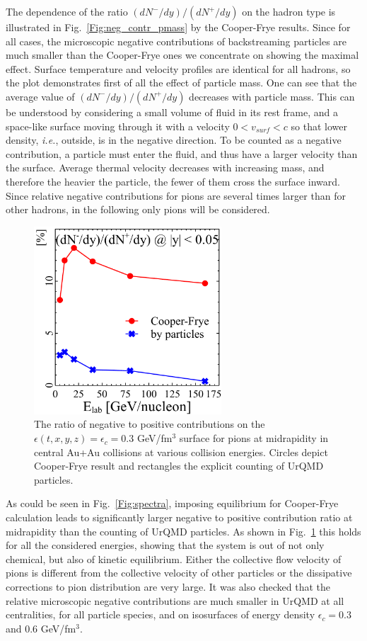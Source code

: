 The dependence of the ratio $(dN^-/dy)/(dN^+/dy)$ on the hadron type
is illustrated in Fig.~\ref{Fig:neg_contr_pmass} by the Cooper-Frye
results. Since for all cases, the microscopic negative contributions
of backstreaming particles are much smaller than the Cooper-Frye ones
we concentrate on showing the maximal effect. Surface temperature and
velocity profiles are identical for all hadrons, so the plot
demonstrates first of all the effect of particle mass. One can see
that the average value of $(dN^-/dy)/(dN^+/dy)$ decreases with
particle mass. This can be understood by considering a small volume of
fluid in its rest frame, and a space-like surface moving through it
with a velocity $0<v_{surf}<c$ so that lower density, \emph{i.e.},
outside, is in the negative direction. To be counted as a negative
contribution, a particle must enter the fluid, and thus have a larger
velocity than the surface. Average thermal velocity decreases with
increasing mass, and therefore the heavier the particle, the fewer of
them cross the surface inward. Since relative negative contributions
for pions are several times larger than for other hadrons,
in the following only pions will be considered.


\begin{figure}[htp]
\includegraphics[width=7cm]{plots/cooper_frye/neg_vs_E.pdf}
\caption{ The ratio of negative to positive
  contributions on the $\epsilon(t,x,y,z) = \epsilon_c = 0.3$
  GeV/fm$^3$ surface for pions at midrapidity in central Au+Au
  collisions at various collision energies. Circles depict Cooper-Frye
  result and rectangles the explicit counting of UrQMD particles.}
\label{Fig:neg_contr_Ecoll}
\end{figure}

As could be seen in Fig.~\ref{Fig:spectra}, imposing equilibrium for
Cooper-Frye calculation leads to significantly larger negative to
positive contribution ratio at midrapidity than the counting of UrQMD
particles. As shown in Fig.~\ref{Fig:neg_contr_Ecoll} this holds for
all the considered energies, showing that the system is out of
not only chemical, but also of kinetic equilibrium. Either the
collective flow velocity of pions is different from the collective
velocity of other particles \cite{Sorge:1995pw,Pratt:1998gt} or the
dissipative corrections to pion distribution are very large. It was
also checked that the relative microscopic negative contributions are
much smaller in UrQMD at all centralities, for all particle species,
and on isosurfaces of energy density $\epsilon_c = 0.3$ and 0.6
GeV/fm$^3$.

